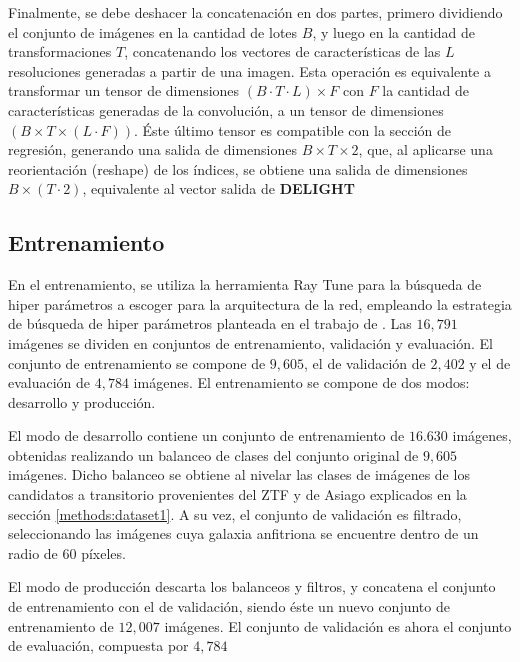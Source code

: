 \documentclass[../tesis.tex]{subfiles}
\begin{document}
Finalmente, se debe deshacer la concatenación en dos partes, primero dividiendo el conjunto de imágenes en la cantidad de lotes $B$, y luego en la cantidad de transformaciones $T$, concatenando los vectores de características de las $L$ resoluciones generadas a partir de una imagen. Esta operación es equivalente a transformar un tensor de dimensiones $(B \cdot T \cdot L)\times F$ con $F$ la cantidad de características generadas de la convolución, a un tensor de dimensiones $(B \times T \times (L \cdot F))$. Éste último tensor es compatible con la sección de regresión, generando una salida de dimensiones $B \times T \times 2$, que, al aplicarse una reorientación (reshape) de los índices, se obtiene una salida de dimensiones $B \times (T \cdot 2)$, equivalente al vector salida de \textbf{DELIGHT}\par\null\par

\subsection{Entrenamiento}
En el entrenamiento, se utiliza la herramienta Ray Tune \cite{raytune} para la búsqueda de hiper parámetros a escoger para la arquitectura de la red, empleando la estrategia de búsqueda de hiper parámetros planteada en el trabajo de \cite{delight}. Las $16,791$ imágenes se dividen en conjuntos de entrenamiento, validación y evaluación. El conjunto de entrenamiento se compone de $9,605$, el de validación de $2,402$ y el de evaluación de $4,784$ imágenes. El entrenamiento se compone de dos modos: desarrollo y producción.\par\null\par

El modo de desarrollo contiene un conjunto de entrenamiento de $16.630$ imágenes, obtenidas realizando un balanceo de clases del conjunto original de $9,605$ imágenes. Dicho balanceo se obtiene al nivelar las clases de imágenes de los candidatos a transitorio provenientes del ZTF y de Asiago explicados en la sección \ref{methods:dataset1}. A su vez, el conjunto de validación es filtrado, seleccionando las imágenes cuya galaxia anfitriona se encuentre dentro de un radio de $60$ píxeles.\par\null\par

El modo de producción descarta los balanceos y filtros, y concatena el conjunto de entrenamiento con el de validación, siendo éste un nuevo conjunto de entrenamiento de $12,007$ imágenes. El conjunto de validación es ahora el conjunto de evaluación, compuesta por $4,784$\par\null\par
\end{document}
